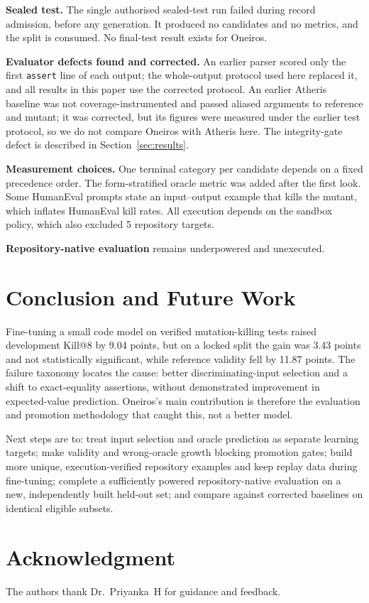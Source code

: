 \documentclass[10pt,conference,letterpaper]{IEEEtran}
\makeatletter
\newif\ifanonymous
\newif\ifaidisclosure
\newcommand{\killk}[1]{Kill@#1}
\makeatother
\begin{document}
\textbf{Sealed test.} The single authorised sealed-test run failed during record
admission, before any generation. It produced no candidates and no metrics, and the
split is consumed. No final-test result exists for Oneiros.

\textbf{Evaluator defects found and corrected.} An earlier parser scored only the first
\texttt{assert} line of each output; the whole-output protocol used here replaced it,
and all results in this paper use the corrected protocol. An earlier Atheris baseline
was not coverage-instrumented and passed aliased arguments to reference and mutant; it
was corrected, but its figures were measured under the earlier test protocol, so we do
not compare Oneiros with Atheris here. The integrity-gate defect is described in
Section~\ref{sec:results}.

\textbf{Measurement choices.} One terminal category per candidate depends on a fixed
precedence order. The form-stratified oracle metric was added after the first look.
Some HumanEval prompts state an input--output example that kills the mutant, which
inflates HumanEval kill rates. All execution depends on the sandbox policy, which also
excluded 5 repository targets.

\textbf{Repository-native evaluation} remains underpowered and unexecuted.

\section{Conclusion and Future Work}

Fine-tuning a small code model on verified mutation-killing tests raised development
\killk{8} by 9.04 points, but on a locked split the gain was 3.43 points and not
statistically significant, while reference validity fell by 11.87 points. The failure
taxonomy locates the cause: better discriminating-input selection and a shift to
exact-equality assertions, without demonstrated improvement in expected-value
prediction. Oneiros's main contribution is therefore the evaluation and promotion
methodology that caught this, not a better model.

Next steps are to: treat input selection and oracle prediction as separate learning
targets; make validity and wrong-oracle growth blocking promotion gates; build more
unique, execution-verified repository examples and keep replay data during
fine-tuning; complete a sufficiently powered repository-native evaluation on a new,
independently built held-out set; and compare against corrected baselines on identical
eligible subsets.

\section*{Acknowledgment}
\ifanonymous\else
The authors thank Dr.~Priyanka~H for guidance and feedback.
\fi
\ifaidisclosure
Anthropic Claude (Claude Code) assisted in preparing the initial drafts of the
Abstract, Nomenclature, Sections I--VIII, Tables I--IV, Fig.~1 and the reference list
from author-supplied experiment records.
\fi

\balance


\end{document}
